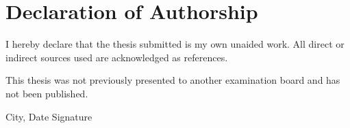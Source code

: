 
\chapter*{Declaration of Authorship}
\thispagestyle{empty}

I hereby declare that the thesis submitted is my own unaided work. All direct or indirect sources used are acknowledged as references.

\vspace{.5\baselineskip}
This thesis was not previously presented to another examination board and has not been published.

\vspace{4\baselineskip}
\begin{center}
\parbox{.8\textwidth}{City, Date \hfill Signature}
\end{center}

\endinput
